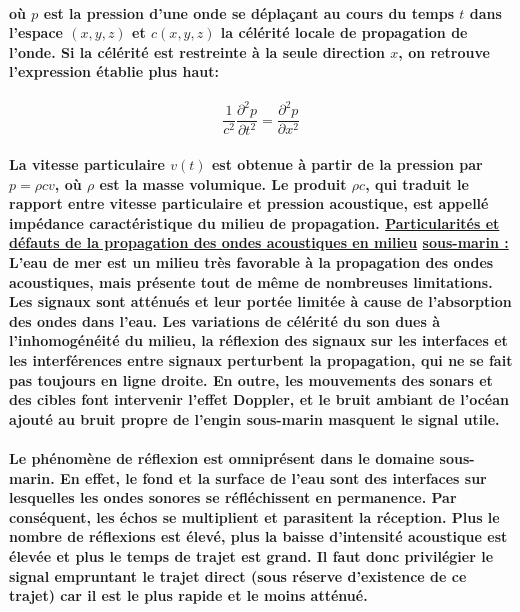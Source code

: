 \documentclass[a4paper,11pt]{article}
\begin{document}
\paragraph{\normalfont o\`{u} $p$ est la pression d'une onde se d\'{e}pla\c{c}ant au cours du temps $t$ dans l'espace $(x,y,z)$ et $c(x,y,z)$ la c\'{e}l\'{e}rit\'{e} locale de propagation de l'onde. Si la c\'{e}l\'{e}rit\'{e} est restreinte \`{a} la seule direction $x$, on retrouve l'expression \'{e}tablie plus haut:}
\[ \frac{1}{c^{2}}\frac{\partial^{2} p}{\partial t^{2}}=\frac{\partial^{2} p}{\partial x^{2}}\]
\paragraph{\normalfont La vitesse particulaire $v(t)$ est obtenue \`{a} partir de la pression par $p=\rho cv$, o\`{u} $\rho$ est la masse volumique. Le produit $\rho c$, qui traduit le rapport entre vitesse particulaire et pression acoustique, est appell\'{e} imp\'{e}dance caract\'{e}ristique du milieu de propagation. \newline \newline
\underline{Particularit\'{e}s et d\'{e}fauts de la propagation des ondes acoustiques en milieu} \newline \underline{sous-marin :}\newline
L'eau de mer est un milieu tr\`{e}s favorable \`{a} la propagation des ondes acoustiques, mais pr\'{e}sente tout de m\^{e}me de nombreuses limitations. Les signaux sont \textbf{att\'{e}nu\'{e}s} et leur port\'{e}e limit\'{e}e \`{a} cause de l'\textbf{absorption des ondes dans l'eau}. Les \textbf{variations de c\'{e}l\'{e}rit\'{e}} du son dues \`{a} l'\textbf{inhomog\'{e}n\'{e}it\'{e} du milieu}, la \textbf{r\'{e}flexion des signaux sur les interfaces} et les \textbf{interf\'{e}rences entre signaux} perturbent la propagation, qui ne se fait pas toujours en ligne droite. En outre, les mouvements des sonars et des cibles font intervenir l'effet Doppler, et le \textbf{bruit ambiant de l'oc\'{e}an} ajout\'{e} au bruit propre de l'engin sous-marin masquent le signal utile. \newline}
\paragraph{\normalfont Le ph\'{e}nom\`{e}ne de r\'{e}flexion est omnipr\'{e}sent dans le domaine sous-marin. En effet, le fond et la surface de l'eau sont des interfaces sur lesquelles les ondes sonores se r\'{e}fl\'{e}chissent en permanence. Par cons\'{e}quent, les \'{e}chos se multiplient et parasitent la r\'{e}ception. Plus le nombre de r\'{e}flexions est \'{e}lev\'{e}, plus la baisse d'intensit\'{e} acoustique est \'{e}lev\'{e}e et plus le temps de trajet est grand. Il faut donc privil\'{e}gier le signal empruntant le trajet direct (\textbf{sous r\'{e}serve d'existence de ce trajet}) car il est le plus rapide et le moins att\'{e}nu\'{e}.\newline}
\end{document}
